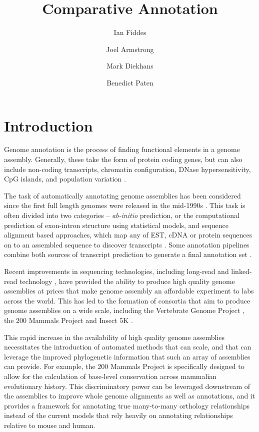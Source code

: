 \documentclass[fleqn,10pt]{wlscirep}
\title{Comparative Annotation}
\author[1,+]{Ian Fiddes}
\author[1,+]{Joel Armstrong}
\author[1,]{Mark Diekhans}
\author[1,*]{Benedict Paten}
\affil[1]{UCSC}
\affil[*]{corresponding.author@email.example}
\affil[+]{these authors contributed equally to this work}
\begin{document}
\flushbottom
\maketitle

\thispagestyle{empty}


\section{Introduction}

Genome annotation is the process of finding functional elements in a genome assembly. Generally, these take the form of protein coding genes, but can also include non-coding transcripts\cite{harrow2012gencode}, chromatin configuration, DNase hypersensitivity\cite{encode2004encode}, CpG islands, and population variation \cite{sherry2001dbsnp}.

The task of automatically annotating genome assemblies has been considered since the first full length genomes were released in the mid-1990s \cite{letovsky1998gdb,lukashin1998genemark,haussler1996generalized}. This task is often divided into two categories -- \textit{ab-initio} prediction, or the computational prediction of exon-intron structure using statistical models, and sequence alignment based approaches, which map any of EST, cDNA or protein sequences on to an assembled sequence to discover transcripts \cite{Aken01012016}. Some annotation pipelines combine both sources of transcript prediction to generate a final annotation set \cite{pruitt2006ncbi,cantarel2008maker}.

Recent improvements in sequencing technologies, including long-read \cite{gordon2016long} and linked-read technology \cite{10xassembly}, have provided the ability to produce high quality genome assemblies at prices that make genome assembly an affordable experiment to labs across the world. This has led to the formation of consortia that aim to produce genome assemblies on a wide scale, including the Vertebrate Genome Project \cite{haussler2009genome}, the 200 Mammals Project and Insect 5K \cite{robinson2011creating}.

This rapid increase in the availability of high quality genome assemblies necessitates the introduction of automated methods that can scale, and that can leverage the improved phylogenetic information that such an array of assemblies can provide. For example, the 200 Mammals Project is specifically designed to allow for the calculation of base-level conservation across mammalian evolutionary history. This discriminatory power can be leveraged downstream of the assemblies to improve whole genome alignments as well as annotations, and it provides a framework for annotating true many-to-many orthology relationships instead of the current models that rely heavily on annotating relationships relative to mouse and human.
\end{document}
